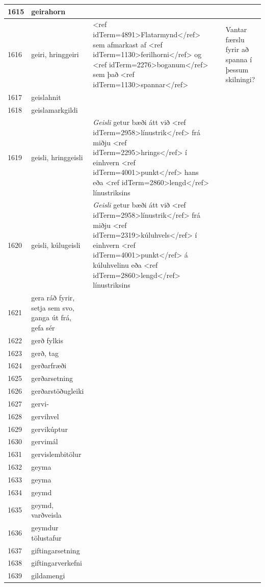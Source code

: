 \begin{longtable}{p{}|p{}|p{}|p{}|p{}}
\hline
1615 & geirahorn &  &  &  \\
\hline
1616 & geiri, hringgeiri & <ref idTerm=4891>Flatarmynd</ref> sem afmarkast af <ref idTerm=1130>ferilhorni</ref> og <ref idTerm=2276>boganum</ref> sem það <ref idTerm=1130>spannar</ref> & & Vantar færslu fyrir að spanna í þessum skilningi? \\
\hline
1617 & geislahnit &  &  &  \\
\hline
1618 & geislamarkgildi &  &  &  \\
\hline
1619 & geisli, hringgeisli & \textit{Geisli} getur bæði átt við <ref idTerm=2958>línustrik</ref> frá miðju <ref idTerm=2295>hrings</ref> í einhvern <ref idTerm=4001>punkt</ref> hans eða <ref idTerm=2860>lengd</ref> línustriksins &  &  \\
\hline
1620 & geisli, kúlugeisli & \textit{Geisli} getur bæði átt við <ref idTerm=2958>línustrik</ref> frá miðju <ref idTerm=2319>kúluhvels</ref> í einhvern <ref idTerm=4001>punkt</ref> á kúluhvelinu eða <ref idTerm=2860>lengd</ref> línustriksins &  &  \\
\hline
1621 & gera ráð fyrir, setja sem svo, ganga út frá, gefa sér &  &  &  \\
\hline
1622 & gerð fylkis &  &  &  \\
\hline
1623 & gerð, tag &  &  &  \\
\hline
1624 & gerðarfræði &  &  &  \\
\hline
1625 & gerðarsetning &  &  &  \\
\hline
1626 & gerðarstöðugleiki &  &  &  \\
\hline
1627 & gervi- &  &  &  \\
\hline
1628 & gervihvel &  &  &  \\
\hline
1629 & gervikúptur &  &  &  \\
\hline
1630 & gervimál &  &  &  \\
\hline
1631 & gervislembitölur &  &  &  \\
\hline
1632 & geyma &  &  &  \\
\hline
1633 & geyma &  &  &  \\
\hline
1634 & geymd &  &  &  \\
\hline
1635 & geymd, varðveisla &  &  &  \\
\hline
1636 & geymdur tölustafur &  &  &  \\
\hline
1637 & giftingarsetning &  &  &  \\
\hline
1638 & giftingarverkefni &  &  &  \\
\hline
1639 & gildamengi &  &  &  \\

\end{longtable}
